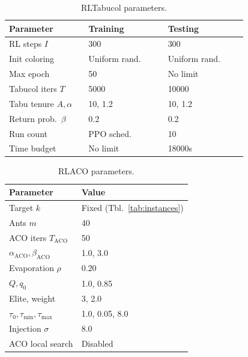   \begin{table}[!htbp]
  \centering
  \caption{RLTabucol parameters.}
  \label{tab:rltabucol-parameters}
  \scriptsize
  \setlength{\tabcolsep}{4pt}
  \renewcommand{\arraystretch}{1.05}
  \begin{tabular}{@{}p{0.30\linewidth}p{0.30\linewidth}p{0.30\linewidth}@{}}
  \toprule
  Parameter & Training & Testing \\
  \midrule
  RL steps $I$          & 300          & 300 \\
  Init coloring         & Uniform rand.& Uniform rand. \\
  Max epoch             & 50           & No limit \\
  Tabucol iters $T$     & 5000         & 10000 \\
  Tabu tenure $A,\alpha$& 10, 1.2      & 10, 1.2 \\
  Return prob.\ $\beta$ & 0.2          & 0.2 \\
  Run count             & PPO sched.   & 10 \\
  Time budget           & No limit     & 18000s \\
  \bottomrule
  \end{tabular}
  \end{table}

  \begin{table}[!htbp]
  \centering
  \caption{RLACO parameters.}
  \label{tab:rlaco-parameters}
  \scriptsize
  \setlength{\tabcolsep}{5pt}
  \renewcommand{\arraystretch}{1.05}
  \begin{tabular}{@{}ll@{}}
  \toprule
  Parameter & Value \\
  \midrule
  Target $k$            & Fixed (Tbl.~\ref{tab:instances}) \\
  Ants $m$              & 40 \\
  ACO iters $T_{\mathrm{ACO}}$ & 50 \\
  $\alpha_{\mathrm{ACO}},\beta_{\mathrm{ACO}}$ & 1.0, 3.0 \\
  Evaporation $\rho$    & 0.20 \\
  $Q,q_0$               & 1.0, 0.85 \\
  Elite, weight         & 3, 2.0 \\
  $\tau_0,\tau_{\min},\tau_{\max}$ & 1.0, 0.05, 8.0 \\
  Injection $\sigma$    & 8.0 \\
  ACO local search      & Disabled \\
  \bottomrule
  \end{tabular}
  \end{table}

